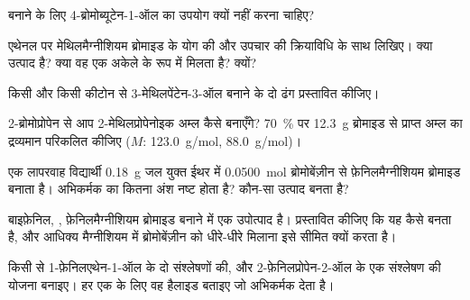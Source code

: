 \begin{exercise}[$\star$]\label{exo:b1:organomagnesium:4}
 बनाने के लिए 4-ब्रोमोब्यूटेन-1-ऑल का उपयोग क्यों नहीं करना चाहिए?
\end{exercise}

\begin{exercise}[$\star\star$]\label{exo:b1:organomagnesium:5}
एथेनल पर मेथिलमैग्नीशियम ब्रोमाइड के योग की
और उपचार की क्रियाविधि  के साथ लिखिए। क्या उत्पाद  है? क्या वह
एक अकेले  के रूप में मिलता है? क्यों?
\end{exercise}

\begin{exercise}[$\star\star$]\label{exo:b1:organomagnesium:6}
किसी  और किसी कीटोन से 3-मेथिलपेंटेन-3-ऑल बनाने के दो ढंग
प्रस्तावित कीजिए।
\end{exercise}

\begin{exercise}[$\star\star$]\label{exo:b1:organomagnesium:7}
2-ब्रोमोप्रोपेन से आप 2-मेथिलप्रोपेनोइक अम्ल कैसे बनाएँगे?
\qty{70}{\percent}  पर \qty{12.3}{g} ब्रोमाइड से प्राप्त अम्ल का द्रव्यमान
परिकलित कीजिए ($M$:  \qty{123.0}{g/mol}, 
\qty{88.0}{g/mol})।
\end{exercise}

\begin{exercise}[$\star\star$]\label{exo:b1:organomagnesium:8}
एक लापरवाह विद्यार्थी \qty{0.18}{g} जल युक्त ईथर में
\qty{0.0500}{mol} ब्रोमोबेंज़ीन से फ़ेनिलमैग्नीशियम ब्रोमाइड बनाता है।
अभिकर्मक का कितना अंश नष्ट होता है? कौन-सा उत्पाद बनता है?
\end{exercise}

\begin{exercise}[$\star\star$]\label{exo:b1:organomagnesium:9}
बाइफ़ेनिल, , फ़ेनिलमैग्नीशियम ब्रोमाइड बनाने में एक उपोत्पाद है।
प्रस्तावित कीजिए कि यह कैसे बनता है, और आधिक्य मैग्नीशियम में
ब्रोमोबेंज़ीन को धीरे-धीरे मिलाना इसे सीमित क्यों करता है।
\end{exercise}

\begin{exercise}[$\star\star\star$]\label{exo:b1:organomagnesium:10}
किसी  से 1-फ़ेनिलएथेन-1-ऑल के दो संश्लेषणों की, और
2-फ़ेनिलप्रोपेन-2-ऑल के एक संश्लेषण की योजना बनाइए। हर एक के लिए वह हैलाइड बताइए जो
अभिकर्मक देता है।
\end{exercise}

